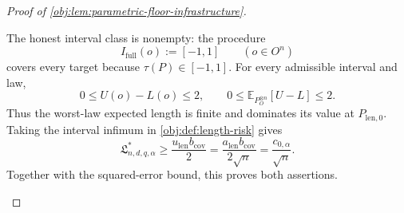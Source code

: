 \begin{proof}[Proof of \cref{obj:lem:parametric-floor-infrastructure}]
\begin{enumerate}
The honest interval class is nonempty: the procedure
\[
I_{\mathrm{full}}(o):=[-1,1]
\qquad(o\in O^n)
\]
covers every target because \(\tau(P)\in[-1,1]\). For every admissible interval and law,
\[
0\le U(o)-L(o)\le2,
\qquad
0\le\mathbb E_{P_O^{\otimes n}}[U-L]\le2.
\]
Thus the worst-law expected length is finite and dominates its value at \(P_{\mathrm{len},0}\). Taking the interval infimum in \cref{obj:def:length-risk} gives
\[
\mathfrak L^*_{n,d,q,\alpha}
\ge
\frac{u_{\mathrm{len}}b_{\mathrm{cov}}}{2}
=
\frac{a_{\mathrm{len}}b_{\mathrm{cov}}}{2\sqrt n}
=
\frac{c_{0,\alpha}}{\sqrt n}.
\]
Together with the squared-error bound, this proves both assertions.
\end{enumerate}
\end{proof}
